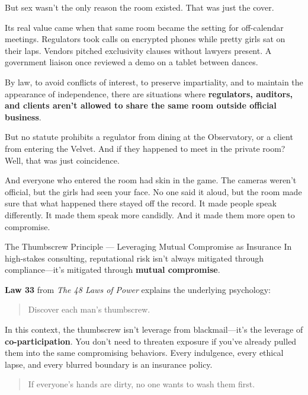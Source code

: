 \medskip

But sex wasn’t the only reason the room existed. That was just the cover.

Its real value came when that same room became the setting for off-calendar meetings. Regulators took calls on encrypted 
phones while pretty girls sat on their laps. Vendors pitched exclusivity clauses without lawyers present. A government 
liaison once reviewed a demo on a tablet between dances.

By law, to avoid conflicts of interest, to preserve impartiality, and to maintain the appearance of independence,
there are situations where \textbf{regulators, auditors, and clients aren’t allowed to share the same room outside
official business}.

But no statute prohibits a regulator from dining at the Observatory, or a client from entering the Velvet. And if they 
happened to meet in the private room? Well, that was just coincidence.

And everyone who entered the room had skin in the game. The cameras weren’t official, but the girls had seen your face. No 
one said it aloud, but the room made sure that what happened there stayed off the record. It made people speak differently. 
It made them speak more candidly. And it made them more open to compromise.

\medskip

\begin{PhilosophicalSidebar}{The Thumbscrew Principle --- Leveraging Mutual Compromise as Insurance}
In high-stakes consulting, reputational risk isn’t always mitigated through compliance—it’s mitigated through 
\textbf{mutual compromise}.  

\medskip

\textbf{Law 33} from \textit{The 48 Laws of Power} explains the underlying psychology:  

\begin{quote}
Discover each man’s thumbscrew.
\end{quote}

In this context, the thumbscrew isn’t leverage from blackmail—it’s the leverage of \textbf{co-participation}. 
You don’t need to threaten exposure if you’ve already pulled them into the same compromising behaviors. Every 
indulgence, every ethical lapse, and every blurred boundary is an insurance policy.  

\begin{quote}
If everyone’s hands are dirty, no one wants to wash them first.
\end{quote}
\end{PhilosophicalSidebar}

